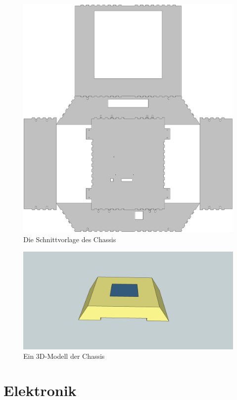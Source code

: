 \documentclass[a4paper,bibtotoc,oneside]{scrbook}
\begin{document}
\begin{figure}[htbp]
\centering
\includegraphics[width=125mm]{img/gehause3.png}
\caption[Chassis]{Die Schnittvorlage des Chassis}\label{gehause}
\end{figure}

\begin{figure}[htbp]
\centering
\includegraphics[width=125mm]{img/robo3d.png}
\caption[Chassis]{Ein 3D-Modell der Chassis}\label{robo3d}
\end{figure}


\section{Elektronik}\thispagestyle{empty}
\end{document}
